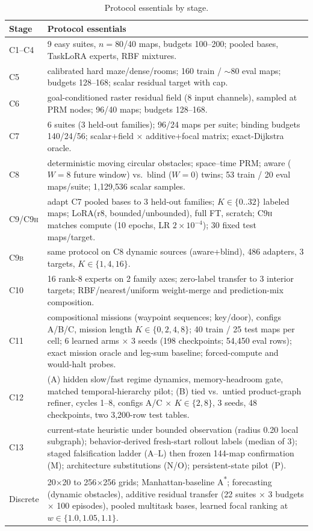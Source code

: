 \documentclass[letterpaper]{article} %
\newcommand{\stage}[1]{\textsc{#1}}
\begin{document}
\begin{table}[h]
\centering
\footnotesize
\begin{tabular}{@{}lp{5.6cm}@{}}
\toprule
Stage & Protocol essentials \\
\midrule
\stage{C1--C4} & 9 easy suites, $n{=}80$/40 maps, budgets 100--200; pooled bases, TaskLoRA experts, RBF mixtures. \\
\stage{C5} & calibrated hard maze/dense/rooms; 160 train / $\sim$80 eval maps; budgets 128--168; scalar residual target with cap. \\
\stage{C6} & goal-conditioned raster residual field (8 input channels), sampled at PRM nodes; 96/40 maps; budgets 128--168. \\
\stage{C7} & 6 suites (3 held-out families); 96/24 maps per suite; binding budgets 140/24/56; scalar+field $\times$ additive+focal matrix; exact-Dijkstra oracle. \\
\stage{C8} & deterministic moving circular obstacles; space--time PRM; aware ($W{=}8$ future window) vs.\ blind ($W{=}0$) twins; 53 train / 20 eval maps/suite; 1{,}129{,}536 scalar samples. \\
\stage{C9/C9h} & adapt \stage{C7} pooled bases to 3 held-out families; $K\in\{0..32\}$ labeled maps; LoRA(r8, bounded/unbounded), full FT, scratch; \stage{C9h} matches compute (10 epochs, LR $2{\times}10^{-4}$); 30 fixed test maps/target. \\
\stage{C9b} & same protocol on \stage{C8} dynamic sources (aware+blind), 486 adapters, 3 targets, $K\in\{1,4,16\}$. \\
\stage{C10} & 16 rank-8 experts on 2 family axes; zero-label transfer to 3 interior targets; RBF/nearest/uniform weight-merge and prediction-mix composition. \\
\stage{C11} & compositional missions (waypoint sequences; key/door), configs A/B/C, mission length $K\in\{0,2,4,8\}$; 40 train / 25 test maps per cell; 6 learned arms $\times$ 3 seeds (198 checkpoints; 54{,}450 eval rows); exact mission oracle and leg-sum baseline; forced-compute and would-halt probes. \\
\stage{C12} & (A) hidden slow/fast regime dynamics, memory-headroom gate, matched temporal-hierarchy pilot; (B) tied vs.\ untied product-graph refiner, cycles 1--8, configs A/C $\times$ $K\in\{2,8\}$, 3 seeds, 48 checkpoints, two 3{,}200-row test tables. \\
\stage{C13} & current-state heuristic under bounded observation (radius 0.20 local subgraph); behavior-derived fresh-start rollout labels (median of 3); staged falsification ladder (\stage{A}--\stage{L}) then frozen 144-map confirmation (\stage{M}); architecture substitutions (\stage{N}/\stage{O}); persistent-state pilot (\stage{P}). \\
Discrete & 20$\times$20 to 256$\times$256 grids; Manhattan-baseline A\textsuperscript{*}; forecasting (dynamic obstacles), additive residual transfer (22 suites $\times$ 3 budgets $\times$ 100 episodes), pooled multitask bases, learned focal ranking at $w\in\{1.0,1.05,1.1\}$. \\
\bottomrule
\end{tabular}
\caption{Protocol essentials by stage.}
\label{tab:protocols}
\end{table}
\end{document}
